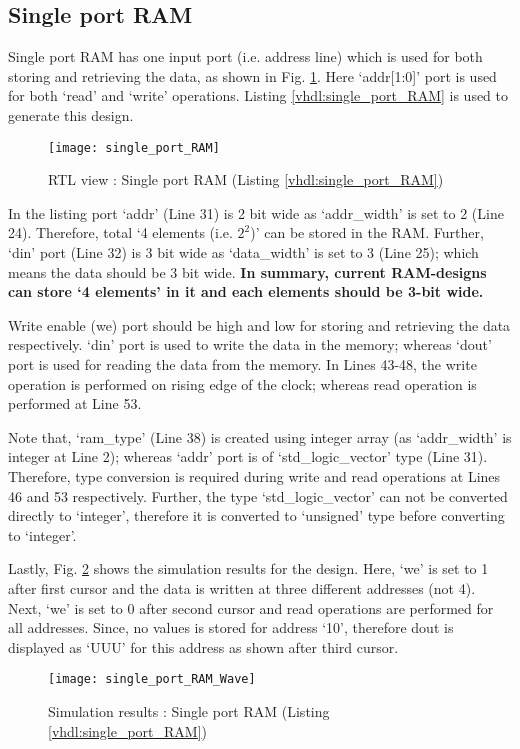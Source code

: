 \subsection{Single port RAM}
Single port RAM has one input port (i.e. address line) which is used for both storing and retrieving the data, as shown in Fig. \ref{fig:single_port_RAM}. Here `addr[1:0]' port is used for both `read' and `write' operations. Listing \ref{vhdl:single_port_RAM} is used to generate this design. 
\begin{figure}[!h]
	\centering
	\texttt{[image: single\_port\_RAM]}
	\caption{RTL view : Single port RAM (Listing \ref{vhdl:single_port_RAM})}
	\label{fig:single_port_RAM}
\end{figure}

\begin{explanation}
	In the listing port `addr' (Line 31) is 2 bit wide as `addr\_width' is set to 2 (Line 24). Therefore, total `4 elements (i.e. $2^2$)' can be stored in the RAM. Further, `din' port (Line 32) is 3 bit wide as `data\_width' is set to 3 (Line 25); which means the data should be 3 bit wide. \textbf{In summary, current RAM-designs can store `4 elements' in it and each elements should be 3-bit wide.}
	
	Write enable (we) port should be high and low for storing and retrieving the data respectively. `din' port is used to write the data in the memory; whereas `dout' port is used for reading the data from the memory. In Lines 43-48, the write operation is performed on rising edge of the clock; whereas read operation is performed at Line 53. 
	
	Note that, `ram\_type' (Line 38) is created using integer array (as `addr\_width' is integer at Line 2); whereas `addr' port is of `std\_logic\_vector' type (Line 31). Therefore, type conversion is required during write and read operations at Lines 46 and 53 respectively. Further, the type `std\_logic\_vector' can not be converted directly to `integer', therefore it is converted to `unsigned' type before converting to `integer'. 
	
	Lastly, Fig. \ref{fig:single_port_RAM_Wave} shows the simulation results for the design. Here, `we' is set to 1 after first cursor and the data is written at three different addresses (not 4). Next, `we' is set to 0 after second cursor and read operations are performed for all addresses. Since, no values is stored for address `10', therefore dout is displayed as `UUU' for this address as shown after third cursor. 
	\begin{figure}[!h]
		\centering
		\texttt{[image: single\_port\_RAM\_Wave]}
		\caption{Simulation results : Single port RAM (Listing \ref{vhdl:single_port_RAM})}
		\label{fig:single_port_RAM_Wave}
	\end{figure}
\end{explanation}

